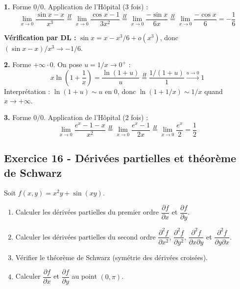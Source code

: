 \documentclass[12pt,a4paper]{article}
\begin{document}
\begin{boitecorrige}
\textbf{1.} Forme $0/0$. Application de l'Hôpital (3 fois) :
\[
\lim_{x\to0}\frac{\sin x - x}{x^3} \overset{H}{=} \lim_{x\to0}\frac{\cos x - 1}{3x^2} \overset{H}{=} \lim_{x\to0}\frac{-\sin x}{6x} \overset{H}{=} \lim_{x\to0}\frac{-\cos x}{6} = \boxed{-\frac{1}{6}}
\]

\textbf{Vérification par DL :} $\sin x = x - x^3/6 + o(x^3)$, donc $(\sin x - x)/x^3 \to -1/6$.

\textbf{2.} Forme $+\infty \cdot 0$. On pose $u = 1/x \to 0^+$ :
\[
x\ln\!\left(1+\frac{1}{x}\right) = \frac{\ln(1+u)}{u} \overset{H}{=} \frac{1/(1+u)}{1}\xrightarrow{u\to0} \boxed{1}
\]
Interprétation : $\ln(1+u) \sim u$ en $0$, donc $\ln(1+1/x) \sim 1/x$ quand $x\to+\infty$.

\textbf{3.} Forme $0/0$. Application de l'Hôpital (2 fois) :
\[
\lim_{x\to0}\frac{e^x-1-x}{x^2} \overset{H}{=} \lim_{x\to0}\frac{e^x-1}{2x} \overset{H}{=} \lim_{x\to0}\frac{e^x}{2} = \boxed{\frac{1}{2}}
\]
\end{boitecorrige}

\subsection*{Exercice 16 - Dérivées partielles et théorème de Schwarz \niveau{\moyen}}
\begin{boiteexercice}
Soit $f(x,y) = x^2y + \sin(xy)$.

\begin{enumerate}
  \item Calculer les dérivées partielles du premier ordre $\dfrac{\partial f}{\partial x}$ et $\dfrac{\partial f}{\partial y}$.
  \item Calculer les dérivées partielles du second ordre $\dfrac{\partial^2 f}{\partial x^2}$, $\dfrac{\partial^2 f}{\partial y^2}$, $\dfrac{\partial^2 f}{\partial x\partial y}$ et $\dfrac{\partial^2 f}{\partial y\partial x}$.
  \item Vérifier le théorème de Schwarz (symétrie des dérivées croisées).
  \item Calculer $\dfrac{\partial f}{\partial x}$ et $\dfrac{\partial f}{\partial y}$ au point $(0, \pi)$.
\end{enumerate}
\end{boiteexercice}
\end{document}
